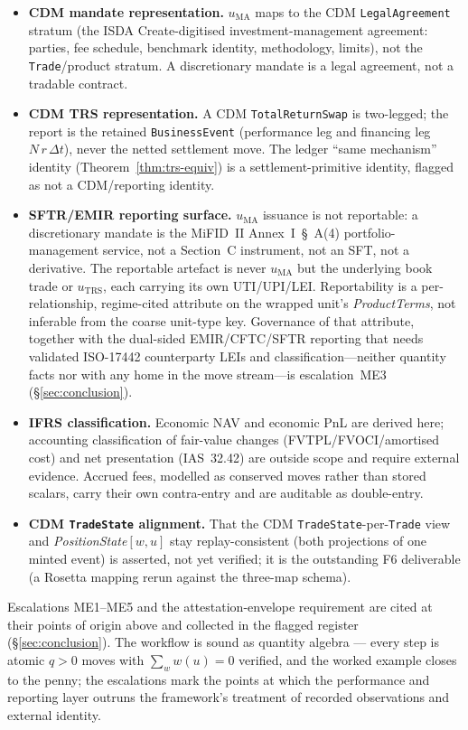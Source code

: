 \documentclass[11pt,a4paper]{article}
\begin{document}
\begin{itemize}[leftmargin=*]
\item \textbf{CDM mandate representation.} $u_{\mathrm{MA}}$ maps to the CDM
\texttt{LegalAgreement} stratum (the ISDA Create-digitised investment-management agreement:
parties, fee schedule, benchmark identity, methodology, limits), not the \texttt{Trade}/product
stratum. A discretionary mandate is a legal agreement, not a tradable contract.
\item \textbf{CDM TRS representation.} A CDM \texttt{TotalReturnSwap} is two-legged; the report is
the retained \texttt{BusinessEvent} (performance leg and financing leg $N\,r\,\Delta t$), never the
netted settlement move. The ledger ``same mechanism'' identity (Theorem~\ref{thm:trs-equiv}) is a
settlement-primitive identity, flagged as not a CDM/reporting identity.
\item \textbf{SFTR/EMIR reporting surface.} $u_{\mathrm{MA}}$ issuance is not reportable: a
discretionary mandate is the MiFID~II Annex~I~\S~A(4) portfolio-management service, not a Section~C
instrument, not an SFT, not a derivative.
The reportable artefact is never $u_{\mathrm{MA}}$ but the underlying book trade or
$u_{\mathrm{TRS}}$, each carrying its own UTI/UPI/LEI. Reportability is a per-relationship,
regime-cited attribute on the wrapped unit's \textit{ProductTerms}, not inferable from the coarse
unit-type key. Governance of that attribute, together with the dual-sided EMIR/CFTC/SFTR reporting
that needs validated ISO-17442 counterparty LEIs and classification---neither quantity facts nor
with any home in the move stream---is escalation~ME3 (\S\ref{sec:conclusion}).
\item \textbf{IFRS classification.} Economic NAV and economic PnL are derived here; accounting
classification of fair-value changes (FVTPL/FVOCI/amortised cost) and net presentation
(IAS~32.42) are outside scope and require external evidence. Accrued fees, modelled as conserved
moves rather than stored scalars, carry their own contra-entry and are auditable as double-entry.
\item \textbf{CDM \texttt{TradeState} alignment.} That the CDM
\texttt{TradeState}-per-\texttt{Trade} view and \textit{PositionState}$[w,u]$ stay replay-consistent
(both projections of one minted event) is asserted, not yet verified; it is the outstanding F6
deliverable (a Rosetta mapping rerun against the three-map schema).
\end{itemize}

Escalations ME1--ME5 and the attestation-envelope requirement are cited at their points of origin
above and collected in the flagged register (\S\ref{sec:conclusion}). The workflow is sound as
quantity algebra --- every step is atomic $q>0$ moves with $\sum_w w(u)=0$ verified, and the worked
example closes to the penny; the escalations mark the points at which the performance and reporting
layer outruns the framework's treatment of recorded observations and external identity.
\end{document}
